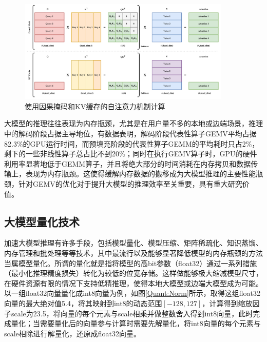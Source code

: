 \begin{figure}[!htbp]
	\centering
    \includegraphics[width=0.9\textwidth]{figures/KVCache.pdf}
    \caption{使用因果掩码和KV缓存的自注意力机制计算}
	\label{KVCache}
\end{figure}

大模型的推理往往表现为内存瓶颈，尤其是在用户量不多的本地或边端场景，推理中的解码阶段占据主导地位\cite{InferLinear}，有数据表明，解码阶段代表性算子GEMV平均占据82.3\%的GPU运行时间，而预填充阶段的代表性算子GEMM的平均耗时只占2\%，剩下的一些非线性算子总占比不到20\%；同时在执行GEMV算子时，GPU的硬件利用率显著地低于GEMM算子，并且将绝大部分的时间消耗在内存拷贝和数据传输上，表现为内存瓶颈\cite{SamsungHotChips}。这使得缓解内存数据的搬移成为大模型推理的主要性能瓶颈，针对GEMV的优化对于提升大模型的推理效率至关重要，具有重大研究价值。

\subsection{大模型量化技术}
加速大模型推理有许多手段，包括模型量化、模型压缩、矩阵稀疏化、知识蒸馏、内存管理和批处理等等技术\cite{LLMInferSurveyTsingHua}，其中最流行以及能够显著降低模型的内存瓶颈的方法当属模型量化。所谓的量化就是指将模型的高bit参数（float32）通过一系列措施（最小化推理精度损失）转化为较低的位宽存储。这样做能够极大缩减模型尺寸，在硬件资源有限的情况下支持低精推理，使得本地大模型或边端大模型成为可能。以一组float32向量量化成int8向量为例，如图\ref{Quant:Norm}所示，取得这组float32向量的最大绝对值5.4，将其映射到int8的动态范围$[-128,127]$，计算得到缩放因子scale为23.5，将向量的每个元素与scale相乘并做整数舍入得到int8向量，此时完成量化；当需要量化后的向量参与计算时需要先解量化，将int8向量的每个元素与scale相除进行解量化，还原成float32向量。


